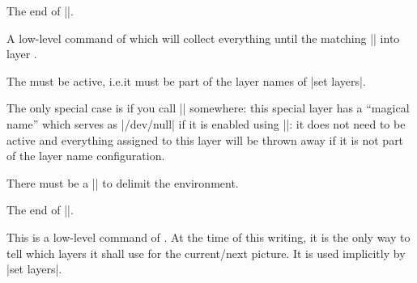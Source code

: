 \begin{command}{\endpgfplotsonlayer}
    The end of |\pgfplotsonlayer|.
\end{command}

\begin{command}{\pgfonlayer{}}
    A low-level command of \PGF{} which will collect everything until the
    matching |\endpgfonlayer| into layer .

    The  must be active, i.e.\@ it must be part of the layer
    names of |set layers|.

    The only special case is if you call || somewhere:
    this special layer has a ``magical name'' which serves as |/dev/null| if it
    is enabled using ||: it does not need to be active and
    everything assigned to this layer will be thrown away if it is not part of
    the layer name configuration.

    There must be a |\endpgfonlayer| to delimit the environment.
\end{command}

\begin{command}{\endpgfonlayer}
    The end of |\pgfonlayer|.
\end{command}


\begin{command}{\pgfsetlayers{}}
    This is a low-level command of \PGF{}. At the time of this writing, it is
    the only way to tell \PGF{} which layers it shall use for the current/next
    picture. It is used implicitly by |set layers|.
\end{command}
